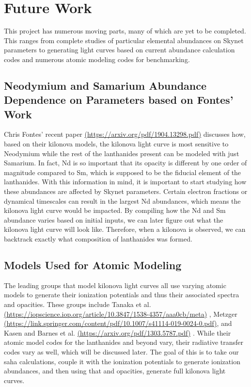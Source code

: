 \documentclass[11pt,a4paper]{article}
\begin{document}
\section{Future Work}

This project has numerous moving parts, many of which are yet to be completed. This ranges from complete studies of particular elemental abundances on Skynet parameters to generating light curves based on current abundance calculation codes and numerous atomic modeling codes for benchmarking. 

\subsection{Neodymium and Samarium Abundance Dependence on Parameters based on Fontes' Work}

Chris Fontes’ recent paper \url{(https://arxiv.org/pdf/1904.13298.pdf)} discusses how, based on their kilonova models, the kilonova light curve is most sensitive to Neodymium while the rest of the lanthanides present can be modeled with just Samarium. In fact, Nd is so important that its opacity is different by one order of magnitude compared to Sm, which is supposed to be the fiducial element of the lanthanides. 
With this information in mind, it is important to start studying how these abundances are affected by Skynet parameters. Certain electron fractions or dynamical timescales can result in the largest Nd abundances, which means the kilonova light curve would be impacted. By compiling how the Nd and Sm abundance varies based on initial inputs, we can later figure out what the kilonova light curve will look like. Therefore, when a kilonova is observed, we can backtrack exactly what composition of lanthanides was formed. 

\subsection{Models Used for Atomic Modeling}

The leading groups that model kilonova light curves all use varying atomic models to generate their ionization potentials and thus their associated spectra and opacities. These groups include Tanaka et al.\url{(https://iopscience.iop.org/article/10.3847/1538-4357/aaa0cb/meta)} , Metzger \url{(https://link.springer.com/content/pdf/10.1007/s41114-019-0024-0.pdf)}, and Kasen and Barnes et al. \url{(https://arxiv.org/pdf/1303.5787.pdf)} .
While their atomic model codes for the lanthanides and beyond vary, their radiative transfer codes vary as well, which will be discussed later. The goal of this is to take our saha calculations, couple it with the ionization potentials to generate ionization abundances, and then using that and opacities, generate full kilonova light curves.  
\end{document}
